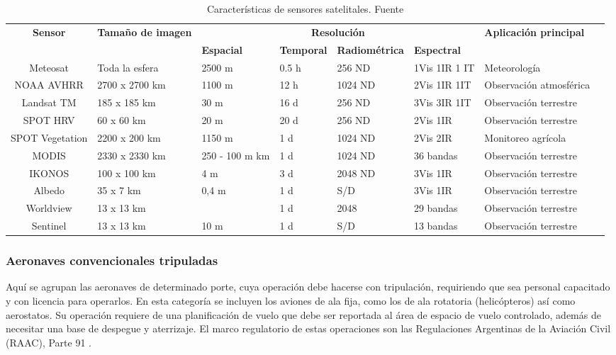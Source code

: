 \begin{table}[H]
    \centering
    \caption{Características de sensores satelitales. Fuente \cite{noauthor_3_nodate}}
    \begin{tabular}{|c|p{20mm}|p{15mm}|p{15mm}|p{25mm}|p{20mm}|p{20mm}|p{20mm}|}
        \hline
        \textbf{Sensor} & \textbf{Tamaño de imagen} & \multicolumn{4}{c}{\textbf{Resolución}} & \textbf{Aplicación principal} \\
        & & \textbf{Espacial} & \textbf{Temporal} & \textbf{Radiométrica} & \textbf{Espectral}  &\\
        \hline \hline
        Meteosat & Toda la esfera & 	2500 m 	& 0.5 h 	& 256 ND 	& 1Vis 1IR 1 IT & Meteorología\\
        \hline
        NOAA AVHRR & 2700 x 2700 km	& 1100 m 	 	& 12 h 	& 1024 ND 	& 2Vis 1IR 1IT & Observación atmosférica\\
        \hline
        Landsat TM 	& 185 x 185 km & 30 m 	 	& 16 d 	& 256 ND 	& 3Vis 3IR 1IT & Observación terrestre\\
        \hline
        SPOT HRV & 60 x 60 km	& 20 m 	 	& 20 d	& 256 ND 	& 2Vis 1IR & Observación terrestre\\
        \hline
        SPOT Vegetation & 2200 x 200 km	& 1150 m 	 	& 1 d	& 1024 ND 	& 2Vis 2IR & Monitoreo agrícola\\
        \hline
        MODIS & 2330 x 2330 km	& 250 - 100 m 	 km 	& 1 d	& 1024 ND 	& 36 bandas & Observación terrestre\\
        \hline
        IKONOS & 100 x 100 km	& 4 m 	 	& 3 d 	& 2048 ND 	& 3Vis 1IR & Observación terrestre\\
        \hline
        Albedo & 35 x 7 km & 0,4 m  & 1 d & S/D & 3Vis 1IR & Observación terrestre\\
        \hline
         Worldview & 13 x 13 km &   & 1 d & 2048 & 29 bandas & Observación terrestre\\
        \hline
         Sentinel & 13 x 13 km &  10 m & 1 d & S/D & 13 bandas & Observación terrestre\\
        \hline
    \end{tabular}

\label{Satelites}
\end{table}
\subsubsection{Aeronaves convencionales tripuladas}
Aquí se agrupan las aeronaves de determinado porte, cuya operación debe hacerse con tripulación, requiriendo que sea personal capacitado y con licencia para operarlos. En esta categoría se incluyen los aviones de ala fija, como los de ala rotatoria (helicópteros) así como aerostatos. Su operación requiere de una planificación de vuelo que debe ser reportada al área de espacio de vuelo controlado, además de necesitar una base de despegue y aterrizaje. El marco regulatorio de estas operaciones son las Regulaciones Argentinas de la Aviación Civil (RAAC), Parte 91 \cite{noauthor_infoleg_nodate-1}.
